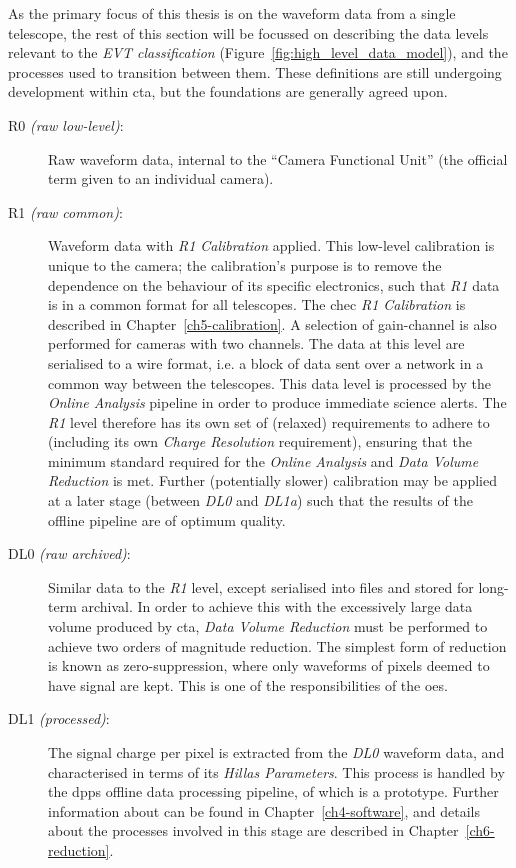 As the primary focus of this thesis is on the waveform data from a single telescope, the rest of this section will be focussed on describing the data levels relevant to the \textit{EVT classification} (Figure~\ref{fig:high_level_data_model}), and the processes used to transition between them. These definitions are still undergoing development within \gls{cta}, but the foundations are generally agreed upon.
\begin{description}
\item[R0 \textit{(raw low-level)}:]
Raw waveform data, internal to the ``Camera Functional Unit'' (the official term given to an individual camera).
\item[R1 \textit{(raw common)}:]
Waveform data with \textit{R1 Calibration} applied. This low-level calibration is unique to the camera; the calibration's purpose is to remove the dependence on the behaviour of its specific electronics, such that \textit{R1} data is in a common format for all telescopes. The \gls{chec} \textit{R1 Calibration} is described in Chapter~\ref{ch5-calibration}. A selection of gain-channel is also performed for cameras with two channels. The data at this level are serialised to a wire format, i.e. a block of data sent over a network in a common way between the telescopes. This data level is processed by the \textit{Online Analysis} pipeline in order to produce immediate science alerts. The \textit{R1} level therefore has its own set of (relaxed) requirements to adhere to (including its own \textit{Charge Resolution} requirement), ensuring that the minimum standard required for the \textit{Online Analysis} and \textit{Data Volume Reduction} is met. Further (potentially slower) calibration may be applied at a later stage (between \textit{DL0} and \textit{DL1a}) such that the results of the offline pipeline are of optimum quality. 
\item[DL0 \textit{(raw archived)}:]
Similar data to the \textit{R1} level, except serialised into files and stored for long-term archival. In order to achieve this with the excessively large data volume produced by \gls{cta}, \textit{Data Volume Reduction} must be performed to achieve two orders of magnitude reduction. The simplest form of reduction is known as zero-suppression, where only waveforms of pixels deemed to have signal are kept. This is one of the responsibilities of the \gls{oes}.
\item[DL1 \textit{(processed)}:]
The signal charge per pixel is extracted from the \textit{DL0} waveform data, and characterised in terms of its \textit{Hillas Parameters}. This process is handled by the \gls{dpps} offline data processing pipeline, of which  is a prototype. Further information about  can be found in Chapter~\ref{ch4-software}, and details about the processes involved in this stage are described in Chapter~\ref{ch6-reduction}.

\end{description}
